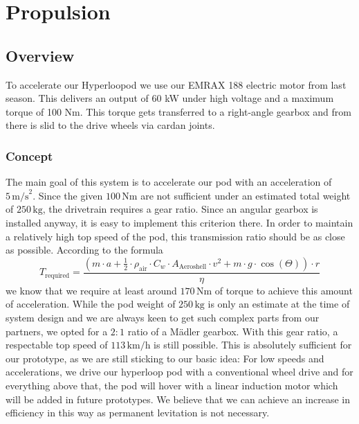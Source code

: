 \section{Propulsion}

\subsection{Overview}

To accelerate our Hyperloopod we use our EMRAX 188 electric motor from last season. This delivers an output of 60 kW under high voltage and a maximum torque of 100 Nm. This torque gets transferred to a right-angle gearbox and from there is slid to the drive wheels via cardan joints.

\subsubsection{Concept}
The main goal of this system is to accelerate our pod with an acceleration of \(5 \, \text{m/s}^2\). Since the given \(100 \, \text{Nm}\) are not sufficient under an estimated total weight of \(250 \, \text{kg}\), the drivetrain requires a gear ratio. Since an angular gearbox is installed anyway, it is easy to implement this criterion there. In order to maintain a relatively high top speed of the pod, this transmission ratio should be as close as possible. According to the formula
\[
T_{\text{required}} = \frac{{(m \cdot a + \frac{1}{2} \cdot \rho_{\text{air}} \cdot C_w \cdot A_{\text{Aeroshell}} \cdot v^2 + m \cdot g \cdot \cos(\Theta)) \cdot r}}{{\eta}}
\]
we know that we require at least around \(170 \, \text{Nm}\) of torque to achieve this amount of acceleration. While the pod weight of \(250 \, \text{kg}\) is only an estimate at the time of system design and we are always keen to get such complex parts from our partners, we opted for a \(2:1\) ratio of a Mädler gearbox. With this gear ratio, a respectable top speed of \(113 \, \text{km/h}\) is still possible. This is absolutely sufficient for our prototype, as we are still sticking to our basic idea: For low speeds and accelerations, we drive our hyperloop pod with a conventional wheel drive and for everything above that, the pod will hover with a linear induction motor which will be added in future prototypes. We believe that we can achieve an increase in efficiency in this way as permanent levitation is not necessary.


